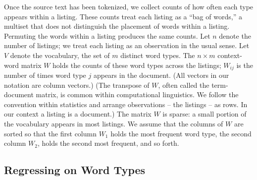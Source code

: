 \documentclass[12pt]{article}
\begin{document}
 Once the source text has been tokenized, we collect counts of how often each
 type appears within a listing.  These counts treat each listing as a ``bag of
 words,'' a multiset that does not distinguish the placement of words within a
 listing.  Permuting the words within a listing produces the same counts.  Let
 $n$ denote the number of listings; we treat each listing as an observation in
 the usual sense.  Let $V$ denote the vocabulary, the set of $m$ distinct word
 types.  The $n \times m$ context-word matrix $W$ holds the counts of these word
 types across the listings; $W_{ij}$ is the number of times word type $j$
 appears in the \ith document.  (All vectors in our notation are column
 vectors.)  (The transpose of $W$, often called the term-document matrix, is
 common within computational linguistics. We follow the convention within
 statistics and arrange observations -- the listings -- as rows. In our context
 a listing is a document.)  The matrix $W$ is sparse: a small portion of the
 vocabulary appears in most listings. We assume that the columns of $W$ are
 sorted so that the first column $W_1$ holds the most frequent word type, the
 second column $W_2$, holds the second most frequent, and so forth.


\subsection{ Regressing on Word Types }  %
\end{document}

